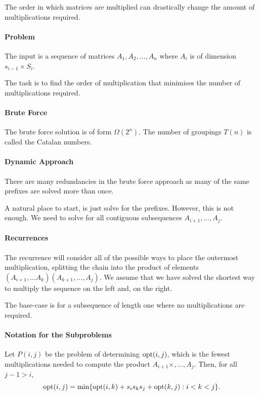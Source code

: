 The order in which matrices are multiplied can drastically change the amount of
multiplications required.

\paragraph{Problem}
The input is a sequence of matrices \(A_1, A_2, \ldots, A_n\) where
\(A_i\) is of dimension  \(s_{i - 1} \times S_i\).

The task is to find the order of multiplication that minimises the number of
multiplications required.

\paragraph{Brute Force}
The brute force solution is of form \(\Omega(2^n)\).
The number of groupings \(T(n)\) is called the Catalan numbers.

\paragraph{Dynamic Approach}
There are many redundancies in the brute force approach as many of the same
prefixes are solved more than once.

A natural place to start, is just solve for the prefixes. However, this is not enough.
We need to solve for all contiguous subsequences \(A_{i + 1}, \ldots, A_j\).

\paragraph{Recurrences}
The recurrence will consider all of the possible ways to place the outermost
multiplication, splitting the chain into the product of elements
\((A_{i + 1}, \ldots A_k)(A_{k + 1}, \ldots, A_j)\).
We assume that we have solved the shortest way to multiply the sequence on the
left and, on the right.

The base-case is for a subsequence of length one where no multiplications are
required.

\paragraph{Notation for the Subproblems}
Let \(P(i, j)\) be the problem of determining \(\mathrm{opt}(i, j)\), which is the fewest
multiplications needed to compute the product \(A_{i + 1} \times , \ldots , A_j\).
Then, for all \(j - 1 > i\),  \[
  \mathrm{opt}(i,j) = \min \{
    \mathrm{opt}(i, k) + s_i s_k s_j + \mathrm{opt}(k, j): i < k < j
  \} 
.\] 

